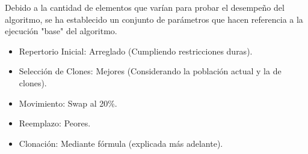 
Debido a la cantidad de elementos que varían para probar el desempeño
del algoritmo, se ha establecido un conjunto de parámetros que hacen
referencia a la ejecución "base" del algoritmo.
\begin{itemize}
	\item Repertorio Inicial: Arreglado (Cumpliendo restricciones duras).
	\item Selección de Clones: Mejores (Considerando la población actual y la de clones).
	\item Movimiento: Swap al 20\%.
	\item Reemplazo: Peores.
	\item Clonación: Mediante fórmula (explicada más adelante).
\end{itemize}

